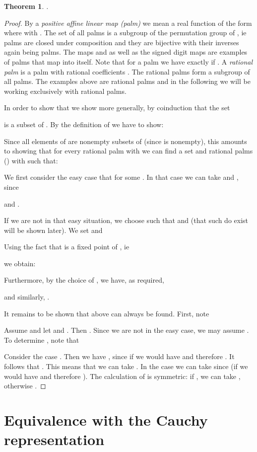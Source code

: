 \documentclass[microtype]{jloganal}
\theoremstyle{plain}
\newtheorem{theorem}{Theorem}[section]
\theoremstyle{definition}
\begin{document}
\begin{theorem}
\label{thm-cantor}
.
\end{theorem}
\begin{proof}
By a \emph{positive affine linear map (palm)} we mean a real function of 
the form  where  with . 
The set of all palms is a subgroup of the permutation group of 
, ie
palms are closed under composition and they are bijective with their 
inverses again being palms. 
The maps  and  as well as the signed digit maps 
 are examples of palms that map  into itself.
Note that for a palm  we have
 exactly if .
A \emph{rational palm} is a palm with rational coefficients . 
The rational palms form a subgroup of
all palms. The examples above are rational palms and in the following we will
be working exclusively with rational palms.

In order to show that  we show more generally,
by coinduction that the set

is a subset of . 
By the definition of  we have to show:

Since all elements of  are nonempty subsets of  
(since  is nonempty), this amounts to showing that
for every rational palm  with  we can find a set 
 and rational palms  () with 
 such that: 
 
We first consider the easy case that  for some
. In that case we can take  and 
, since 

and .


If we are not in that easy situation, we choose  such that
 and 
 (that such  do exist will be 
shown later). We set  and 

Using the fact that  is a fixed point of , ie

we obtain:

Furthermore, by the choice of , we have, as required,

and similarly, .


It remains to be shown that  above can always be found. 
First, note 

Assume  and let  and 
. Then . 
Since we are not in the easy case, we may assume . 
To determine , note that

Consider the case . Then we have  , since 
if  we would have  and therefore .
It follows that . This means that we can take
. 
In the case  we can take  since 
(if  we would have  and therefore ).
The calculation of  is symmetric: if , we can take , 
otherwise .
\end{proof}

\section{Equivalence with the Cauchy representation}
\label{sec-equiv}
\end{document}
